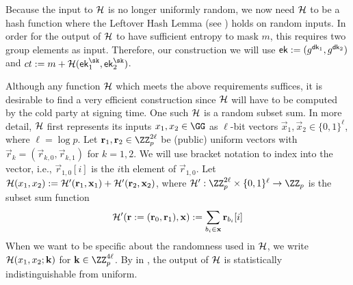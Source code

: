 Because the input to $\mathcal{H}$ is no longer uniformly random, we now need $\mathcal{H}$ to be a hash function where the Leftover Hash Lemma (see ) holds on random inputs. In order for the output of $\mathcal{H}$ to have sufficient entropy to mask $m$, this requires two group elements as input. Therefore, our construction we will use $\mathsf{ek} := (g^{\mathsf{dk}_1}, g^{\mathsf{dk}_2})$ and $ct := m + \lhlhash(\ek_1^\sk, \ek_2^\sk)$.

Although any function $\mathcal{H}$ which meets the above requirements suffices, it is desirable to find a very efficient construction since $\mathcal{H}$ will have to be computed by the cold party at signing time. One such $\mathcal{H}$ is a random subset sum.
In more detail, $\mathcal{H}$ first represents its inputs $x_1, x_2 \in \GG$ as $\ell$-bit vectors $\vec{x}_1, \vec{x}_2 \in \{0,1\}^\ell$, where $\ell = \log{p}$. Let $\vec{r}_1, \vec{r}_2 \in \ZZ_p^{2 \ell}$ be (public) uniform vectors with $\vec{r}_k = (\vec{r}_{k,0}, \vec{r}_{k,1})$ for $k=1,2$. We will use bracket notation to index into the vector, i.e., $\vec{r}_{1,0}[i]$ is the $i$th element of $\vec{r}_{1,0}$.
Let $\mathcal{H}(x_1, x_2) := \mathcal{H}'(\mathbf{r}_1,\mathbf{x}_1) + \mathcal{H}'(\mathbf{r}_2,\mathbf{x}_2)$, where $\lhlhash':\ZZ_p^{2\ell} \times \{0,1\}^\ell \to \ZZ_p$ is the subset sum function
\[
\mathcal{H}'(\mathbf{r} := (\mathbf{r}_0, \mathbf{r}_1),\mathbf{x}) := \sum_{b_i \in \mathbf{x}} \mathbf{r}_{b_i}[i]
\]
When we want to be specific about the randomness used in $\mathcal{H}$, we write $\mathcal{H}(x_1, x_2;\allowbreak \mathbf{k})$ for $\vec{k} \in \ZZ_p^{4\ell}$. By  in , the output of $\mathcal{H}$ is statistically indistinguishable from uniform.